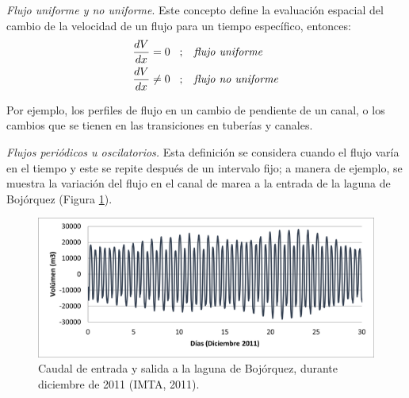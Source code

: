 \documentclass[letterpaper]{report}
\begin{document}
\emph{Flujo uniforme y no uniforme}. Este concepto define la evaluación espacial del cambio de la velocidad de un flujo para un 
tiempo específico, entonces:
\begin{equation}
\begin{aligned}
	\frac{dV}{dx} & = 0 \hspace{0.3cm} ;\hspace{0.3cm} \mbox{\emph{flujo uniforme}} \\
	\frac{dV}{dx} & \neq 0 \hspace{0.3cm} ;\hspace{0.3cm} \mbox{\emph{flujo no uniforme}}
\end{aligned}
\end{equation}

Por ejemplo, los perfiles de flujo en un cambio de pendiente de un canal, o los cambios que se tienen en las transiciones en tuberías y canales.\bigskip

\emph{Flujos periódicos u oscilatorios.} Esta definición se considera cuando el flujo varía en el tiempo y este se repite después de un intervalo fijo; 
a manera de ejemplo, se muestra la variación del flujo en el canal de marea a la entrada de la laguna de Bojórquez (Figura \ref{fig:fig13}). \bigskip

\begin{figure}[H]
	\centering
	\includegraphics[width=.8\linewidth]{fig13}
	\caption{Caudal de entrada y salida a la laguna de Bojórquez, durante diciembre de 2011 (IMTA, 2011).}
	\label{fig:fig13}
\end{figure}
\end{document}
